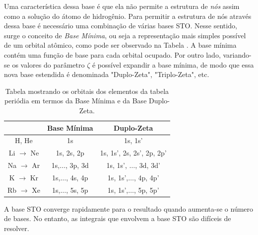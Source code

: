 Uma característica dessa base é que ela não permite a estrutura de \textit{nós} assim como a solução do átomo de hidrogênio. Para permitir a estrutura de nós através dessa base é necessário uma combinação de várias bases STO. Nesse sentido, surge o conceito de \textit{Base Mínima}, ou seja a representação mais simples possível de um orbital atômico, como pode ser observado na Tabela . A base mínima contém uma função de base para cada orbital ocupado. Por outro lado, variando-se os valores do parâmetro $ \zeta $ é possível expandir a base mínima, de modo que essa nova base estendida é denominada "Duplo-Zeta", "Triplo-Zeta", etc. 
\begin{table}[H]
	\centering
	\caption{Tabela mostrando os orbitais dos elementos da tabela periódia em termos da Base Mínima e da Base Duplo-Zeta.}
	\begin{tabular}{ccc} 
		\hline\hline
		& Base Mínima         & Duplo-Zeta                  \\ \hline
		H, He               & 1s                  & 1s, 1s'                     \\
		Li $\rightarrow $ Ne & 1s, 2s, 2p          & 1s, 1s', 2s, 2s', 2p, 2p'   \\
		Na $\rightarrow $ Ar & 1s,$\ldots$, 3p, 3d & 1s, 1s', $\ldots$, 3d, 3d'  \\
		K $\rightarrow $ Kr  & 1s,$\ldots$, 4s, 4p & 1s, 1s',$\ldots$, 4p, 4p'   \\
		Rb $\rightarrow $ Xe & 1s,$\ldots$, 5s, 5p & 1s, 1s',$\ldots$, 5p, 5p'   \\
		\hline\hline
	\end{tabular}
	\label{tab:base_minima}
\end{table}
A base STO converge rapidamente para o resultado quando aumenta-se o número de bases. No entanto, as integrais que envolvem a base STO são difíceis de resolver.
%
%
%
